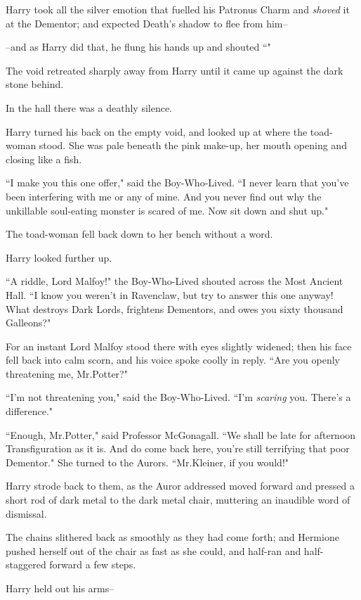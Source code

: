 Harry took all the silver emotion that fuelled his Patronus Charm and \emph{shoved} it at the Dementor; and expected Death's shadow to flee from him\---

\---and as Harry did that, he flung his hands up and shouted ``"

The void retreated sharply away from Harry until it came up against the dark stone behind.

In the hall there was a deathly silence.

Harry turned his back on the empty void, and looked up at where the toad-woman stood. She was pale beneath the pink make-up, her mouth opening and closing like a fish.

``I make you this one offer," said the Boy-Who-Lived. ``I never learn that you've been interfering with me or any of mine. And you never find out why the unkillable soul-eating monster is scared of me. Now sit down and shut up."

The toad-woman fell back down to her bench without a word.

Harry looked further up.

``A riddle, Lord Malfoy!" the Boy-Who-Lived shouted across the Most Ancient Hall. ``I know you weren't in Ravenclaw, but try to answer this one anyway! What destroys Dark Lords, frightens Dementors, and owes you sixty thousand Galleons?"

For an instant Lord Malfoy stood there with eyes slightly widened; then his face fell back into calm scorn, and his voice spoke coolly in reply. ``Are you openly threatening me, Mr.\?Potter?"

``I'm not threatening you," said the Boy-Who-Lived. ``I'm \emph{scaring} you. There's a difference."

``Enough, Mr.\?Potter," said Professor McGonagall. ``We shall be late for afternoon Transfiguration as it is. And do come back here, you're still terrifying that poor Dementor." She turned to the Aurors. ``Mr.\?Kleiner, if you would!"

Harry strode back to them, as the Auror addressed moved forward and pressed a short rod of dark metal to the dark metal chair, muttering an inaudible word of dismissal.

The chains slithered back as smoothly as they had come forth; and Hermione pushed herself out of the chair as fast as she could, and half-ran and half-staggered forward a few steps.

Harry held out his arms\---

